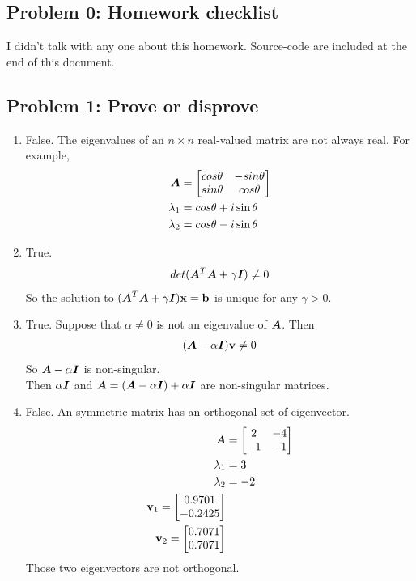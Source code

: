 \documentclass{article}
\begin{document}
 



\hypertarget{}{}
\subsection*{{Problem 0: Homework checklist}}
\label{problem_0_homework_checklist_2}

\checkmark	I didn't talk with any one about this homework. \newline
\checkmark 	Source-code are included at the end of this document. 


\hypertarget{}{}
\subsection*{{Problem 1: Prove or disprove}}
\label{}
\begin{enumerate} 
\item 
False.  The eigenvalues of an $n\times n$ real-valued matrix are not always real. For example, 
\begin{align*} 
\boldsymbol{A} &=\begin{bmatrix} cos\theta & -sin\theta \\ sin\theta & cos\theta \end{bmatrix}\\
\lambda_1 &= cos\theta+i\sin\theta \\
\lambda_2 &= cos\theta-i\sin\theta \\
\end{align*}

\item 
True. 
\begin{align*} 
det(\boldsymbol{A}^T\boldsymbol{A}+\gamma\boldsymbol{I})\neq 0
\end{align*}
So the solution to $(\boldsymbol{A}^T\boldsymbol{A}+\gamma\boldsymbol{I})\boldsymbol{\mathrm{x}}=\boldsymbol{\mathrm{b}}$ is unique for any $\gamma>0$. 
\item 
True. 
Suppose that $\alpha\neq 0$ is not an eigenvalue of $\boldsymbol{A}$. Then 
\begin{align*}
(\boldsymbol{A}-\alpha\boldsymbol{I})\boldsymbol{\mathrm{v}}\neq 0 \\ 
\end{align*}
So $\boldsymbol{A}-\alpha\boldsymbol{I}$ is non-singular. \\
Then $\alpha\boldsymbol{I}$ and $\boldsymbol{A}=(\boldsymbol{A}-\alpha\boldsymbol{I}) + \alpha\boldsymbol{I}$ are non-singular matrices. 

\item 
False. An symmetric matrix has an orthogonal set of eigenvector. 
\begin{align*} 
\boldsymbol{A} &=\begin{bmatrix} 2 & -4 \\ -1 & -1 \end{bmatrix}\\
\lambda_1 &= 3 \\
\lambda_2 &= -2 \\
\boldsymbol{\mathrm{v}}_1=\begin{bmatrix} 0.9701 \\ -0.2425 \end{bmatrix}\\
\boldsymbol{\mathrm{v}}_2=\begin{bmatrix} 0.7071 \\ 0.7071 \end{bmatrix}
\end{align*}
Those two eigenvectors are not orthogonal. 

\end{enumerate} 
\end{document}
